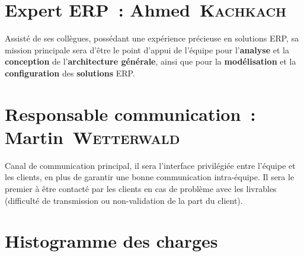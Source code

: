 \section{Expert ERP~: Ahmed~\textsc{Kachkach}}
Assisté de ses collègues, possédant une expérience précieuse en solutions ERP, sa mission principale sera d'être le point d'appui de l'équipe pour l'\textbf{analyse} et la \textbf{conception} de l'\textbf{architecture générale}, ainsi que pour la \textbf{modélisation} et la \textbf{configuration} des \textbf{solutions} ERP.

\section{Responsable communication~: Martin~\textsc{Wetterwald}}
Canal de communication principal, il sera l'interface privilégiée entre l'équipe et les clients, en plus de garantir une bonne communication intra-équipe. Il sera le premier à être contacté par les clients en cas de problème avec les livrables (difficulté de transmission ou non-validation de la part du client).

\section{Histogramme des charges}
